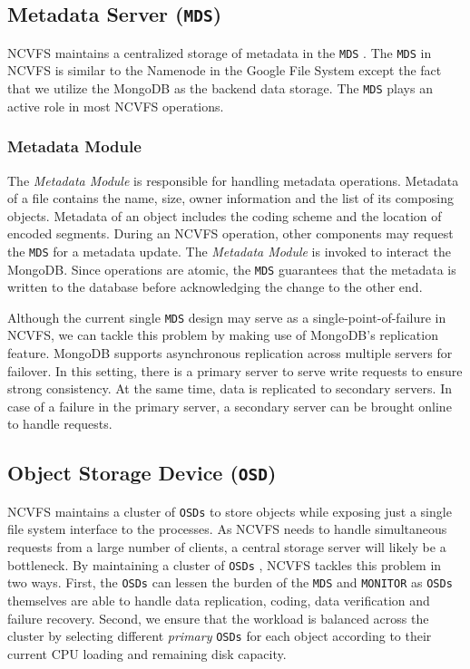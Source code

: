 \documentclass{article}
\def\osds{\texttt{OSDs} }
\def\mds{\texttt{MDS} }
\def\monitor{\texttt{MONITOR} }
\begin{document}
\subsection{Metadata Server (\texttt{MDS})}

NCVFS maintains a centralized storage of metadata in the \mds. The \mds in NCVFS is similar to the 
Namenode in the Google File System except the fact that we utilize the MongoDB as the backend data 
storage. The \mds plays an active role in most NCVFS operations.

\subsubsection{Metadata Module}

The \textit{Metadata Module} is responsible for handling metadata operations. 
Metadata of a file contains the name, size, owner information and the list of its
composing objects. Metadata of an object includes the coding scheme and the
location of encoded segments. During an NCVFS operation, other components
may request the \mds for a metadata update. The \textit{Metadata Module} is invoked
to interact the MongoDB. Since operations are atomic, the \mds guarantees that
the metadata is written to the database before acknowledging the change to the
other end.

Although the current single \mds design may serve as a single-point-of-failure in NCVFS, we can
tackle this problem by making use of MongoDB's replication feature. MongoDB supports asynchronous 
replication across multiple servers for failover. In this setting, there is a primary server 
to serve write requests to ensure strong consistency. At the same time, data is replicated to
secondary servers. In case of a failure in the primary server, a secondary server can be brought 
online to handle requests.

\subsection{Object Storage Device (\texttt{OSD})}

NCVFS maintains a cluster of \osds to store objects while exposing just a single
file system interface to the processes. As NCVFS needs to handle simultaneous
requests from a large number of clients, a central storage server will likely 
be
a bottleneck. By maintaining a cluster of \osds , NCVFS tackles this problem
in two ways. First, the \osds can lessen the burden of the \mds and \monitor as
\osds themselves are able to handle data replication, coding, data verification
and failure recovery. Second, we ensure that the workload is balanced across the
cluster by selecting different \textit{primary} \osds for each object according to their
current CPU loading and remaining disk capacity.
\end{document}
